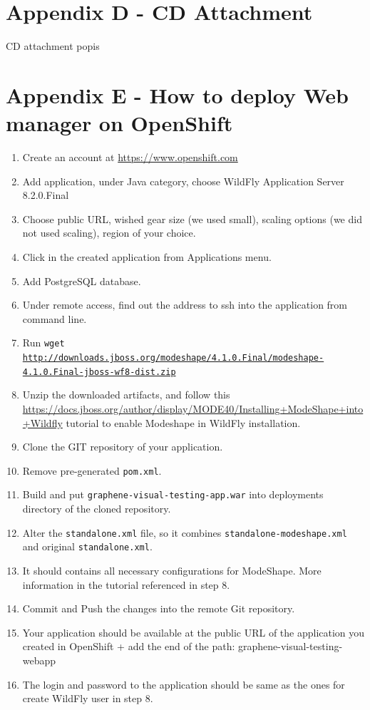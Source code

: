 \documentclass[11pt,oneside,final]{fithesis2}
\begin{document}
\chapter{Appendix D - CD Attachment}
\label{appendix:d}
CD attachment popis

\chapter{Appendix E - How to deploy Web manager on OpenShift}
\label{appendix:e}
\begin{enumerate}
 \item Create an account at \url{https://www.openshift.com}
 \item Add application, under Java category, choose WildFly Application Server 8.2.0.Final
 \item Choose public URL, wished gear size (we used small), scaling options (we did not used scaling), region of your choice.
 \item Click in the created application from Applications menu.
 \item Add PostgreSQL database.
 \item Under remote access, find out the address to ssh into the application from command line.
 \item Run \texttt{wget \url{http://downloads.jboss.org/modeshape/4.1.0.Final/modeshape-4.1.0.Final-jboss-wf8-dist.zip}}
 \item Unzip the downloaded artifacts, and follow this 
    \url{https://docs.jboss.org/author/display/MODE40/Installing+ModeShape+into+Wildfly} tutorial to 
    enable Modeshape in WildFly installation.
 \item Clone the GIT repository of your application.
 \item Remove pre-generated \texttt{pom.xml}.
 \item Build and put \texttt{graphene-visual-testing-app.war} into deployments directory of the cloned repository.
 \item Alter the \texttt{standalone.xml} file, so it combines \texttt{standalone-modeshape.xml} and original \texttt{standalone.xml}.
 \item It should contains all necessary configurations for ModeShape. More information in the tutorial referenced in step 8.
 \item Commit and Push the changes into the remote Git repository.
 \item Your application should be available at the public URL of the application you created in OpenShift + add the end of the path:
 graphene-visual-testing-webapp
 \item The login and password to the application should be same as the ones for create WildFly user in step 8.
\end{enumerate}
\end{document}
